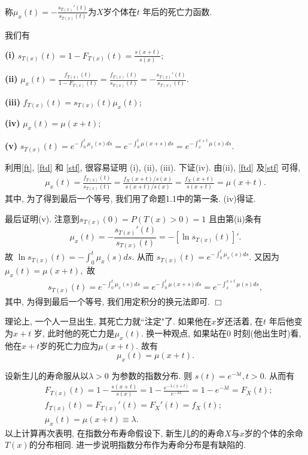 \documentclass[a4paper,10pt]{ctexbook}
\def\qed{\hfill$\Box$\medskip}
\begin{document}
\begin{definition}
    称$\mu_x(t) = -\frac{s_{T(x)}'(t)}{s_{T(x)}(t)}$为$X$岁个体在$t$ 年后的死亡力函数.
\end{definition}

\begin{proposition}\label{p21} 我们有

    {\bf(i)} $s_{T(x)}(t)=1-F_{T(x)}(t)=\frac{s(x+t)}{s(x)};$

    {\bf(ii)} $\mu_{x}(t)=\frac{f_{T(x)}(t)}{1-F_{T(x)}(t)}=\frac{f_{T(x)}(t)}{s_{T(x)}(t)}=-\frac{s_{T(x)}'(t)}{s_{T(x)}(t)}.$

    {\bf(iii)} $f_{T(x)}(t)=s_{T(x)}(t)\mu_{x}(t);$

    {\bf(iv)} $\mu_x(t)=\mu(x+t);$

    {\bf(v)} $s_{T(x)}(t)=e^{-\int_0^t \mu_x(s)ds}=e^{-\int_0^t \mu(x+s)ds}=e^{-\int_x^{x+t} \mu(s)ds}.$

\end{proposition}
\proof 利用\eqref{ft}, \eqref{ftd} 和 \eqref{stf}, 很容易证明 (i), (ii), (iii). 下证(iv). 由(ii), \eqref{ftd} 及\eqref{stf} 可得,
\begin{align*}
    \mu_{x}(t)=\frac{f_{T(x)}(t)}{s_{T(x)}(t)}=\frac{f_{X}(x+t)/s(x)}{s(x+t)/s(x)}=\frac{f_{X}(x+t)}{s(x+t)}=\mu(x+t).
\end{align*}
其中, 为了得到最后一个等号, 我们用了命题1.1中的第一条. (iv)得证.

最后证明(v). 注意到$s_{T(x)}(0)=P(T(x)>0)=1$ 且由第(ii)条有
$$\mu_{x}(t)=-\frac{s_{T(x)}'(t)}{s_{T(x)}(t)}=-[\ln s_{T(x)}(t)]'.$$
故 $\ln s_{T(x)}(t)=-\int_0^t\mu_x(s)ds.$ 从而
$s_{T(x)}(t)=e^{-\int_0^t\mu_x(s)ds}.$ 又因为$\mu_x(t)=\mu(x+t),$ 故
\begin{align*}
    s_{T(x)}(t)=e^{-\int_0^t\mu_x(s)ds}=e^{-\int_0^t\mu(x+s)ds}=e^{-\int_x^{x+t} \mu(s)ds},
\end{align*}
其中, 为得到最后一个等号, 我们用定积分的换元法即可. \qed


\begin{remark}
    理论上, 一个人一旦出生, 其死亡力就``注定"了. 如果他在$x$岁还活着, 在$t$ 年后他变为$x+t$ 岁, 此时他的死亡力是$\mu_x(t).$ 换一种观点, 如果站在0 时刻(他出生时)看, 他在$x+t$岁的死亡力应为$\mu(x+t).$ 故有
    $$\mu_x(t)=\mu(x+t).$$
\end{remark}

\begin{example}
    设新生儿的寿命服从以$\lambda>0$ 为参数的指数分布. 则
    $s(t)=e^{-\lambda t}, t>0.$ 从而有
    \begin{align*}
         & F_{T(x)}(t)=1-\frac{s(x+t)}{s(x)}=1-\frac{e^{-\lambda(x+t)}}{e^{-\lambda x}}=1-e^{-\lambda t} =F_X(t); \\
         & f_{T(x)}(t)=F_{T(x)}'(t)=F_X'(t)=f_X(t);                                                               \\
         & \mu_x(t)=\mu(x+t)\equiv\lambda.
    \end{align*}
    以上计算再次表明, 在指数分布寿命假设下, 新生儿的的寿命$X$与$x$岁的个体的余命$T(x)$的分布相同. 进一步说明指数分布作为寿命分布是有缺陷的.
\end{example}
\end{document}
